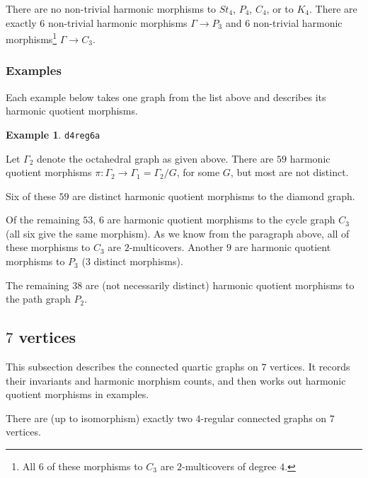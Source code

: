 \documentclass[12pt,letterpaper]{article}
\theoremstyle{definition}
\newtheorem{example}[theorem]{Example}
\begin{document}
There are no non-trivial harmonic morphisms to $St_4$, $P_4$, $C_4$,
or to $K_4$.
There are exactly $6$ non-trivial harmonic morphisms $\Gamma\to P_3$ and
$6$ non-trivial harmonic
morphisms\footnote{All $6$ of these morphisms to $C_3$ are
  $2$-multicovers of degree $4$.} $\Gamma\to C_3$.



\subsubsection{Examples}

Each example below takes one graph from the list above and describes
its harmonic quotient morphisms.


\begin{example}%
\label{example:d4reg6a}
 {\tt d4reg6a}\newline
{\rm  
  Let $\Gamma_2$ denote the octahedral graph as given above.
There are $59$ harmonic quotient morphisms
$\pi: \Gamma_2\to \Gamma_1=\Gamma_2/G$,
for some $G$, but most are not distinct.

Six of these $59$ are distinct harmonic quotient morphisms
to the diamond graph.

Of the remaining $53$, $6$ are
harmonic quotient morphisms to the cycle graph $C_3$ (all six give the same
morphism). As we
know from the paragraph above, all of these morphisms to $C_3$ are
$2$-multicovers. Another $9$ are harmonic quotient morphisms to $P_3$
($3$ distinct morphisms).

The remaining $38$ are (not necessarily distinct)
harmonic quotient morphisms to the path graph $P_2$.
}
\end{example}



\subsection{\texorpdfstring{$7$}{7} vertices}

This subsection describes the connected quartic graphs on $7$ vertices.
It records their invariants and harmonic morphism counts, and then
works out harmonic quotient morphisms in examples.


There are (up to isomorphism) exactly two $4$-regular connected graphs on $7$ vertices.
\end{document}
